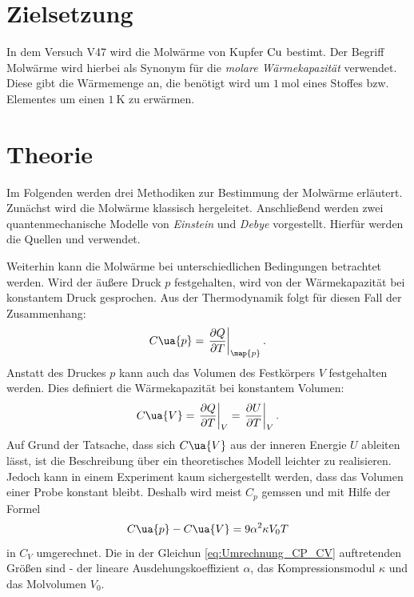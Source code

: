 \setcounter{page}{1}
\section*{Zielsetzung}
In dem Versuch V47 wird die Molwärme von Kupfer $\ce{Cu}$ bestimt.
Der Begriff Molwärme wird hierbei als Synonym für die \emph{molare Wärmekapazität} verwendet.
Diese gibt die Wärmemenge an, die benötigt wird um $\SI{1}{\mol}$ eines Stoffes
bzw. Elementes um einen $\SI{1}{\kelvin}$ zu erwärmen.

\section{Theorie}\label{sec:theorie}
Im Folgenden werden drei Methodiken zur Bestimmung der Molwärme erläutert.
Zunächst wird die Molwärme klassisch hergeleitet. Anschließend werden zwei
quantenmechanische Modelle von \emph{Einstein} und \emph{Debye}
vorgestellt. Hierfür werden die Quellen \cite{anleitungV47} und \cite[S. 215]{marx} verwendet.

Weiterhin kann die Molwärme bei unterschiedlichen Bedingungen betrachtet werden.
Wird der äußere Druck $p$ festgehalten, wird von der Wärmekapazität bei konstantem
Druck gesprochen. Aus der Thermodynamik folgt für diesen Fall der Zusammenhang:
\begin{equation}
  \label{eq:C_P}
  C\ua{p} = \left.\frac{\partial Q}{\partial T}\right|_{\map{p}}.
\end{equation}
Anstatt des Druckes $p$ kann auch das Volumen des Festkörpers $V$ festgehalten
werden. Dies definiert die Wärmekapazität bei konstantem Volumen:
\begin{equation}
  \label{eq:C_V}
  C\ua{V} = \left.\frac{\partial Q}{\partial T}\right|_{V} = \left. \frac{\partial U}{\partial T}\right|_{V}.
\end{equation}
Auf Grund der Tatsache, dass sich $C\ua{V}$ aus der inneren Energie $U$ ableiten
lässt, ist die Beschreibung über ein theoretisches Modell leichter zu realisieren.
Jedoch kann in einem Experiment kaum sichergestellt werden, dass das Volumen einer
Probe konstant bleibt. Deshalb wird meist $C_p$ gemssen und mit Hilfe
der Formel
\begin{equation}
  \label{eq: C_V}
  C\ua{p} - C\ua{V} = 9\alpha^2 \kappa V_0 T
\end{equation}
in $C_V$ umgerechnet. Die in der Gleichun \eqref{eq:Umrechnung_CP_CV} auftretenden
Größen sind - der lineare Ausdehungskoeffizient $\alpha$, das Kompressionsmodul
$\kappa$ und das Molvolumen $V_0$.

